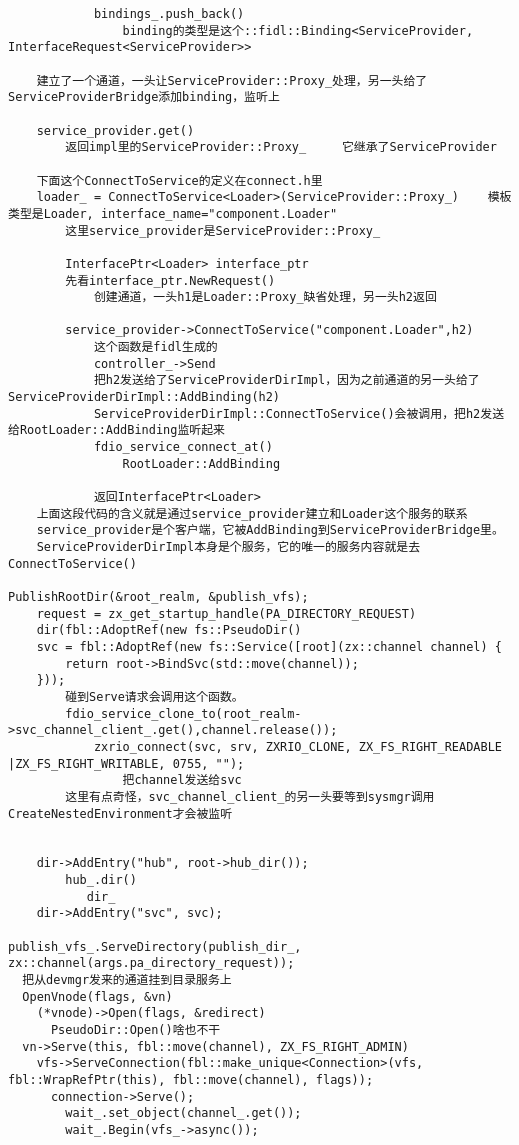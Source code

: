 \begin{verbatim}
            bindings_.push_back()
                binding的类型是这个::fidl::Binding<ServiceProvider, InterfaceRequest<ServiceProvider>>

    建立了一个通道，一头让ServiceProvider::Proxy_处理，另一头给了ServiceProviderBridge添加binding，监听上

    service_provider.get()
        返回impl里的ServiceProvider::Proxy_     它继承了ServiceProvider
        
    下面这个ConnectToService的定义在connect.h里
    loader_ = ConnectToService<Loader>(ServiceProvider::Proxy_)    模板类型是Loader, interface_name="component.Loader"
        这里service_provider是ServiceProvider::Proxy_

        InterfacePtr<Loader> interface_ptr
        先看interface_ptr.NewRequest()
            创建通道，一头h1是Loader::Proxy_缺省处理，另一头h2返回

        service_provider->ConnectToService("component.Loader",h2)
            这个函数是fidl生成的
            controller_->Send
            把h2发送给了ServiceProviderDirImpl，因为之前通道的另一头给了ServiceProviderDirImpl::AddBinding(h2)
            ServiceProviderDirImpl::ConnectToService()会被调用，把h2发送给RootLoader::AddBinding监听起来
            fdio_service_connect_at()
                RootLoader::AddBinding

            返回InterfacePtr<Loader>
    上面这段代码的含义就是通过service_provider建立和Loader这个服务的联系
    service_provider是个客户端，它被AddBinding到ServiceProviderBridge里。
    ServiceProviderDirImpl本身是个服务，它的唯一的服务内容就是去ConnectToService()

PublishRootDir(&root_realm, &publish_vfs);
    request = zx_get_startup_handle(PA_DIRECTORY_REQUEST)
    dir(fbl::AdoptRef(new fs::PseudoDir()
    svc = fbl::AdoptRef(new fs::Service([root](zx::channel channel) {
        return root->BindSvc(std::move(channel));
    }));
        碰到Serve请求会调用这个函数。
        fdio_service_clone_to(root_realm->svc_channel_client_.get(),channel.release());
            zxrio_connect(svc, srv, ZXRIO_CLONE, ZX_FS_RIGHT_READABLE |ZX_FS_RIGHT_WRITABLE, 0755, "");
                把channel发送给svc
        这里有点奇怪，svc_channel_client_的另一头要等到sysmgr调用CreateNestedEnvironment才会被监听


    dir->AddEntry("hub", root->hub_dir());
        hub_.dir()
           dir_
    dir->AddEntry("svc", svc);

publish_vfs_.ServeDirectory(publish_dir_, zx::channel(args.pa_directory_request));
  把从devmgr发来的通道挂到目录服务上
  OpenVnode(flags, &vn)
    (*vnode)->Open(flags, &redirect)
      PseudoDir::Open()啥也不干
  vn->Serve(this, fbl::move(channel), ZX_FS_RIGHT_ADMIN)
    vfs->ServeConnection(fbl::make_unique<Connection>(vfs, fbl::WrapRefPtr(this), fbl::move(channel), flags));
      connection->Serve();
        wait_.set_object(channel_.get());
        wait_.Begin(vfs_->async());


\end{verbatim}
